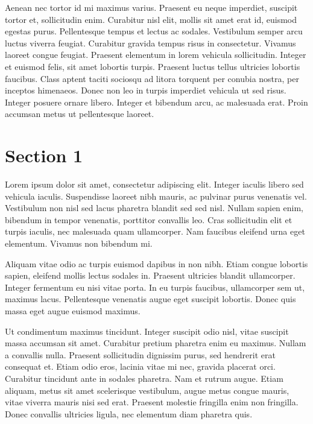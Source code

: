 \documentclass{custom_article}
\begin{document}
Aenean nec tortor id mi maximus varius. Praesent eu neque imperdiet, suscipit tortor et, sollicitudin enim. Curabitur nisl elit, mollis sit amet erat id, euismod egestas purus. Pellentesque tempus et lectus ac sodales. Vestibulum semper arcu luctus viverra feugiat. Curabitur gravida tempus risus in consectetur. Vivamus laoreet congue feugiat. Praesent elementum in lorem vehicula sollicitudin. Integer et euismod felis, sit amet lobortis turpis. Praesent luctus tellus ultricies lobortis faucibus. Class aptent taciti sociosqu ad litora torquent per conubia nostra, per inceptos himenaeos. Donec non leo in turpis imperdiet vehicula ut sed risus. Integer posuere ornare libero. Integer et bibendum arcu, ac malesuada erat. Proin accumsan metus ut pellentesque laoreet. 

\section{Section 1}

Lorem ipsum dolor sit amet, consectetur adipiscing elit. Integer iaculis libero sed vehicula iaculis. Suspendisse laoreet nibh mauris, ac pulvinar purus venenatis vel. Vestibulum non nisl sed lacus pharetra blandit sed sed nisl. Nullam sapien enim, bibendum in tempor venenatis, porttitor convallis leo. Cras sollicitudin elit et turpis iaculis, nec malesuada quam ullamcorper. Nam faucibus eleifend urna eget elementum. Vivamus non bibendum mi.

Aliquam vitae odio ac turpis euismod dapibus in non nibh. Etiam congue lobortis sapien, eleifend mollis lectus sodales in. Praesent ultricies blandit ullamcorper. Integer fermentum eu nisi vitae porta. In eu turpis faucibus, ullamcorper sem ut, maximus lacus. Pellentesque venenatis augue eget suscipit lobortis. Donec quis massa eget augue euismod maximus.

Ut condimentum maximus tincidunt. Integer suscipit odio nisl, vitae suscipit massa accumsan sit amet. Curabitur pretium pharetra enim eu maximus. Nullam a convallis nulla. Praesent sollicitudin dignissim purus, sed hendrerit erat consequat et. Etiam odio eros, lacinia vitae mi nec, gravida placerat orci. Curabitur tincidunt ante in sodales pharetra. Nam et rutrum augue. Etiam aliquam, metus sit amet scelerisque vestibulum, augue metus congue mauris, vitae viverra mauris nisi sed erat. Praesent molestie fringilla enim non fringilla. Donec convallis ultricies ligula, nec elementum diam pharetra quis.
\end{document}
